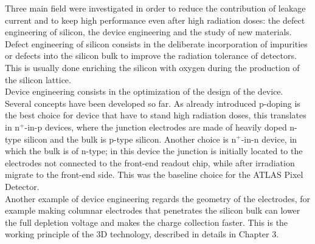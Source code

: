 Three main field were investigated in order to reduce the contribution of leakage current and to keep high performance even after high radiation doses: the defect engineering of silicon, the device engineering and the study of new materials.\\
Defect engineering of silicon consists in the deliberate incorporation of impurities or defects into the silicon bulk to improve the radiation tolerance of detectors. This is usually done enriching the silicon with oxygen during the production of the silicon lattice.\\%
Device engineering consists in the optimization of the design of the device. Several concepts have been developed so far. As already introduced p-doping is the best choice for device that have to stand high radiation doses, this translates in n$^+$-in-p devices, where the junction electrodes are made of heavily doped n-type silicon and the bulk is p-type silicon. Another choice is n$^+$-in-n device, in which the bulk is of n-type; in this device the junction is initially located to the electrodes not connected to the front-end readout chip, while after irradiation migrate to the front-end side. This was the baseline choice for the ATLAS Pixel Detector.\\
Another example of device engineering regards the geometry of the electrodes, for example making columnar electrodes that penetrates the silicon bulk can lower the full depletion voltage and makes the charge collection faster. This is the working principle of the 3D technology, described in details in Chapter 3.\\

